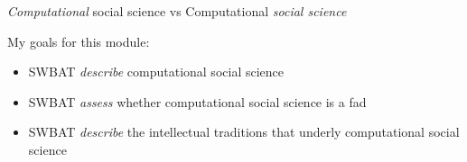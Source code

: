 \documentclass{beamer}
\begin{document}
\begin{frame}

\emph{Computational} social science vs Computational \emph{social science}

\end{frame}
\begin{frame}

My goals for this module:
\begin{itemize}
\item SWBAT \emph{describe} computational social science
\item SWBAT \emph{assess} whether computational social science is a fad
\item SWBAT \emph{describe} the intellectual traditions that underly computational social science
\end{itemize}

\end{frame}
\end{document}
